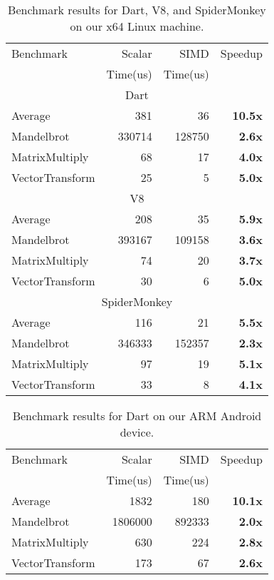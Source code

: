 \documentclass[preprint]{sigplanconf}
\begin{document}
\begin{table}
\begin{center}
\begin{tabular}{|l|r|r|r|}
\hline
 Benchmark & Scalar   & SIMD     & Speedup \\
           & Time(us) & Time(us) &         \\
\hline
\hline
\multicolumn{4}{c}{Dart} \\
\hline
 Average & 381 & 36 & \textbf{10.5x} \\
\hline
 Mandelbrot & 330714 & 128750 & \textbf{2.6x} \\
\hline
 MatrixMultiply & 68 & 17 & \textbf{4.0x} \\
\hline
 VectorTransform & 25 & 5 & \textbf{5.0x} \\
\hline
\hline
\multicolumn{4}{c}{V8} \\
\hline
 Average & 208 & 35 & \textbf{5.9x} \\
 \hline
 Mandelbrot & 393167 & 109158 & \textbf{3.6x} \\
 \hline
 MatrixMultiply & 74 & 20 & \textbf{3.7x} \\
 \hline
 VectorTransform & 30 & 6 & \textbf{5.0x} \\
 \hline
\hline
\multicolumn{4}{c}{SpiderMonkey} \\
\hline
 Average & 116 & 21 & \textbf{5.5x} \\
 \hline
 Mandelbrot & 346333 & 152357 & \textbf{2.3x} \\
 \hline
 MatrixMultiply & 97 & 19 & \textbf{5.1x} \\
 \hline
 VectorTransform & 33 & 8 & \textbf{4.1x} \\
 \hline
\end{tabular}
\end{center}
\caption{Benchmark results for Dart, V8, and SpiderMonkey on our x64 Linux
machine.}
\label{tab:x64-benchmarks}
\end{table}


\begin{table}
\begin{center}
\begin{tabular}{|l|r|r|r|}
\hline
Benchmark & Scalar   & SIMD     & Speedup \\
          & Time(us) & Time(us) &         \\
\hline
\hline
Average & 1832 & 180 & \textbf{10.1x} \\
\hline
Mandelbrot & 1806000 & 892333 & \textbf{2.0x} \\
\hline
MatrixMultiply & 630 & 224 & \textbf{2.8x} \\
\hline
VectorTransform & 173 & 67 & \textbf{2.6x} \\
\hline
\end{tabular}
\end{center}
\caption{Benchmark results for Dart on our ARM Android device.}
\label{tab:arm-benchmarks}
\end{table}
\end{document}
